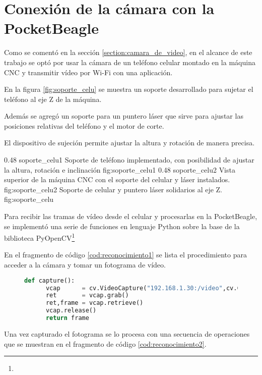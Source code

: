 \section{Conexión de la cámara con la PocketBeagle}
Como se comentó en la sección \ref{section:camara_de_video}, en el alcance de este trabajo se optó por usar la cámara de un teléfono celular montado en la máquina CNC y transmitir vídeo por Wi-Fi con una aplicación.\par
   En la figura \ref{fig:soporte_celu} se muestra un soporte desarrollado para sujetar el teléfono al eje Z de la máquina. \par
   Además se agregó un soporte para un puntero láser que sirve para ajustar las posiciones relativas del teléfono y el motor de corte.\par
   El dispositivo de sujeción permite ajustar la altura y rotación de manera precisa.\par

\subfigab 
{0.48} {soporte_celu1} {Soporte de teléfono implementado, con posibilidad de ajustar la altura, rotación e inclinación} {fig:soporte_celu1}
{0.48} {soporte_celu2} {Vista superior de la máquina CNC con el soporte del celular y láser instalados.\\ \vphantom{1}}{fig:soporte_celu2}
      {Soporte de celular y puntero láser solidarios al eje Z.}
      {fig:soporte_celu}

      Para recibir las tramas de vídeo desde el celular y procesarlas en la PocketBeagle, se implementó una serie de funciones en lenguaje Python sobre la base de la biblioteca PyOpenCV\footnote{\pyopencvlink}\par
   En el fragmento de código \ref{cod:reconocimiento1} se lista el procedimiento para acceder a la cámara y tomar un fotograma de vídeo.\par

\begin{figure}[h]
   \begin{lstlisting}[language=python,caption={Conexión a la cámara del teléfono por Wi-Fi y captura de un fotograma para su posterior procesamiento.},label={cod:reconocimiento1}]
   def capture():
      vcap      = cv.VideoCapture("192.168.1.30:/video",cv.CAP_FFMPEG);
      ret       = vcap.grab()
      ret,frame = vcap.retrieve()
      vcap.release()
      return frame
   \end{lstlisting}
\end{figure}

Una vez capturado el fotograma se lo procesa con una secuencia de operaciones que se muestran en el fragmento de código \ref{cod:reconocimiento2}.

